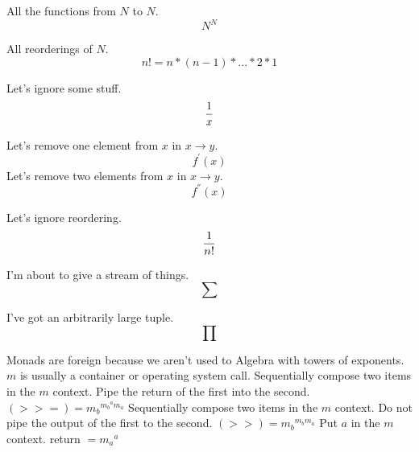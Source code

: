 \documentclass{beamer}
\begin{document}
\begin{frame}[fragile]
All the functions from $N$ to $N$.
$${N^{N}}$$
\end{frame}

\begin{frame}[fragile]
All reorderings of $N$.
$$n! = n*(n-1)*...*2*1$$
\end{frame}


\begin{frame}[fragile]
Let's ignore some stuff.
$${1\over x}$$
\end{frame}

\begin{frame}[fragile]
Let's remove one element from $x$ in $x \rightarrow y.$
$$f^{'}(x)$$
Let's remove two elements from $x$ in $x \rightarrow y.$
$$f^{''}(x)$$
\end{frame}



\begin{frame}[fragile]
Let's ignore reordering.
$${1\over n!}$$
\end{frame}


\begin{frame}[fragile]
I'm about to give a stream of things.
$$\sum$$
\end{frame}


\begin{frame}[fragile]
I've got an arbitrarily large tuple.
$$\prod$$
\end{frame}


\begin{frame}[fragile]
Monads are foreign because we aren't used to Algebra with towers of exponents. $m$ is usually a container or operating system call.\newline\newline
Sequentially compose two items in the $m$ context. Pipe the return of the first into the second.\newline
$(>>=) = {m_b}^{ {m_b}^{a}m_a} $\newline\newline
Sequentially compose two items in the $m$ context. Do not pipe the output of the first to the second.\newline
$(>>) = {m_b}^{m_b m_a}$\newline\newline
Put $a$ in the $m$ context.\newline
return $= {m_a}^{a}$\newline\newline
\end{frame}
\end{document}
